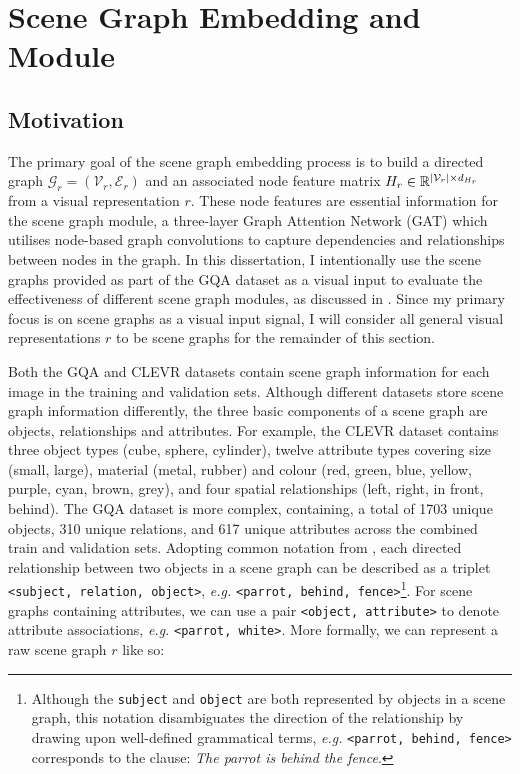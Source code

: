 \section{Scene Graph Embedding and Module}
\label{section:scene_graph_embedding}

\subsection{Motivation}
\label{subsection:scene_graph_embedding_motivation}

The primary goal of the scene graph embedding process is to build a directed graph \(\mathcal{G}_r = (\mathcal{V}_r, \mathcal{E}_r)\) and an associated node feature matrix \(H_r \in \mathbb{R}^{|\mathcal{V}_r| \times d_{H_r}}\) from a visual representation \(r\). These node features are essential information for the scene graph module, a three-layer Graph Attention Network (GAT) \cite{velivckovic2017graph} which utilises node-based graph convolutions to capture dependencies and relationships between nodes in the graph. In this dissertation, I intentionally use the scene graphs provided as part of the GQA dataset as a visual input to evaluate the effectiveness of different scene graph modules, as discussed in \sectionautorefname{ \ref{sec:ablation_studies}}. Since my primary focus is on scene graphs as a visual input signal, I will consider all general visual representations \(r\) to be scene graphs for the remainder of this section.

Both the GQA and CLEVR datasets contain scene graph information for each image in the training and validation sets. Although different datasets store scene graph information differently, the three basic components of a scene graph are objects, relationships and attributes. For example, the CLEVR dataset contains three object types (cube, sphere, cylinder), twelve attribute types covering size (small, large), material (metal, rubber) and colour (red, green, blue, yellow, purple, cyan, brown, grey), and four spatial relationships (left, right, in front, behind). The GQA dataset is more complex, containing, a total of 1703 unique objects, 310 unique relations, and 617 unique attributes across the combined train and validation sets. Adopting common notation from \cite{hudson2019gqa, li2019relation, yang2018graph}, each directed relationship between two objects in a scene graph can be described as a triplet \texttt{<subject, relation, object>}, \textit{e.g.} \texttt{<parrot, behind, fence>}\footnote{Although the \texttt{subject} and \texttt{object} are both represented by objects in a scene graph, this notation disambiguates the direction of the relationship by drawing upon well-defined grammatical terms, \textit{e.g.} \texttt{<parrot, behind, fence>} corresponds to the clause: \textit{The parrot is behind the fence}.}. For scene graphs containing attributes, we can use a pair \texttt{<object, attribute>} to denote attribute associations, \textit{e.g.} \texttt{<parrot, white>}. More formally, we can represent a raw scene graph 
\(r\) like so:

